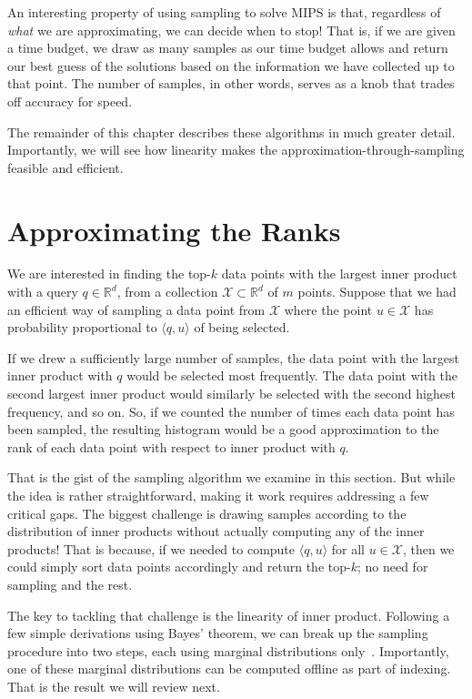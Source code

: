 \begin{svgraybox}
An interesting property of using sampling to solve MIPS is that,
regardless of \emph{what} we are approximating, we can decide when to stop!
That is, if we are given a time budget, we draw as many samples as our
time budget allows and return our best guess of the solutions based on
the information we have collected up to that point. The number of samples,
in other words, serves as a knob that trades off accuracy for speed.
\end{svgraybox}

The remainder of this chapter describes these algorithms in much greater detail.
Importantly, we will see how linearity makes the approximation-through-sampling
feasible and efficient.

\section{Approximating the Ranks}
We are interested in finding the top-$k$ data points
with the largest inner product with a query $q \in \mathbb{R}^d$,
from a collection $\mathcal{X} \subset \mathbb{R}^d$ of $m$ points.
Suppose that we had an efficient way of sampling a data point from $\mathcal{X}$
where the point $u \in \mathcal{X}$ has probability proportional
to $\langle q, u \rangle$ of being selected.

If we drew a sufficiently large number of samples, the data point with the largest
inner product with $q$ would be selected most frequently. The data point with the second
largest inner product would similarly be selected with the second highest frequency, and so on.
So, if we counted the number of times each data point has been sampled,
the resulting histogram would be a good approximation to the rank of each data point
with respect to inner product with $q$.

That is the gist of the sampling algorithm we examine in this section.
But while the idea is rather straightforward, making it work requires addressing
a few critical gaps. The biggest challenge is drawing samples according to
the distribution of inner products without actually computing any of the
inner products! That is because, if we needed to compute $\langle q, u \rangle$
for all $u \in \mathcal{X}$, then we could simply sort data points accordingly
and return the top-$k$; no need for sampling and the rest.

The key to tackling that challenge is the linearity of inner product.
Following a few simple derivations using Bayes' theorem,
we can break up the sampling procedure into two steps, each using marginal distributions
only~\citep{Lorenzen2021wedgeSampling,ballard2015diamondSampling,cohen1997wedgeSampling,pmlr-v89-ding19a}. Importantly, one of these marginal distributions can be computed offline
as part of indexing. That is the result we will review next.

